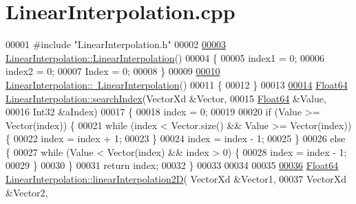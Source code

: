 \hypertarget{_linear_interpolation_8cpp_source}{}\section{Linear\+Interpolation.\+cpp}
\label{_linear_interpolation_8cpp_source}

\begin{DoxyCode}
00001 \textcolor{preprocessor}{#include "LinearInterpolation.h"}
00002 
\hyperlink{class_linear_interpolation_aaae2ec77e7767bb5fc7ca34a6e1197f1}{00003} \hyperlink{class_linear_interpolation_aaae2ec77e7767bb5fc7ca34a6e1197f1}{LinearInterpolation::LinearInterpolation}()
00004 \{
00005     index1 = 0;
00006     index2 = 0;
00007     Index = 0;
00008 \}
00009 
\hyperlink{class_linear_interpolation_a36a34fa39c430e05bdc073c1ac9ad4df}{00010} \hyperlink{class_linear_interpolation_a36a34fa39c430e05bdc073c1ac9ad4df}{LinearInterpolation::~LinearInterpolation}()
00011 \{
00012 \}
00013 
\hyperlink{class_linear_interpolation_aa9faf7177964de6d3b68a69cdbf7ef1a}{00014} \hyperlink{group___tools_ga3f1431cb9f76da10f59246d1d743dc2c}{Float64} \hyperlink{class_linear_interpolation_aa9faf7177964de6d3b68a69cdbf7ef1a}{LinearInterpolation::searchIndex}(VectorXd &Vector, 
00015                                          \hyperlink{group___tools_ga3f1431cb9f76da10f59246d1d743dc2c}{Float64} &Value, 
00016                                          Int32 &aIndex)
00017 \{
00018     index = 0;
00019 
00020     \textcolor{keywordflow}{if} (Value >= Vector(index)) \{
00021         \textcolor{keywordflow}{while} (index < Vector.size() && Value >= Vector(index)) \{
00022             index = index + 1;
00023         \}
00024         index = index - 1;
00025     \}
00026     \textcolor{keywordflow}{else} \{
00027         \textcolor{keywordflow}{while} (Value < Vector(index) && index > 0) \{
00028             index = index - 1;
00029         \}
00030     \}
00031     \textcolor{keywordflow}{return} index;
00032 \}
00033 
00034 
00035 
\hyperlink{class_linear_interpolation_aaf48c1f0fa673ada9b8d6218690161f4}{00036} \hyperlink{group___tools_ga3f1431cb9f76da10f59246d1d743dc2c}{Float64} \hyperlink{class_linear_interpolation_aaf48c1f0fa673ada9b8d6218690161f4}{LinearInterpolation::linearInterpolation2D}(
      VectorXd &Vector1,
00037                                                    VectorXd &Vector2,

\end{DoxyCode}
